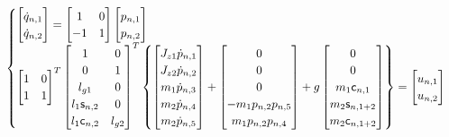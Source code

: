 \begin{itemize}
\begin{equation}
	\begin{cases}

	\begin{bmatrix}
	\dot{q}_{n,1} \\
	\dot{q}_{n,2} \\
	\end{bmatrix}
	=
	\begin{bmatrix}
	1 & 0 \\
	-1 & 1\\
	\end{bmatrix}
	\begin{bmatrix}
	p_{n,1} \\
	p_{n,2} \\
	\end{bmatrix} \\


	\begin{bmatrix}
	1 & 0 \\
	1 & 1 \\
	\end{bmatrix}^T
	\begin{bmatrix}
	 1 & 0 \\
	 0 & 1 \\
	 l_{g1} & 0 \\
	 l_1 \mathsf{s}_{n,2} & 0 \\
	 l_1 \mathsf{c}_{n,2} & l_{g2} \\
	\end{bmatrix}^T
	\begin{Bmatrix}
		\begin{bmatrix}
		J_{z1} \dot{p}_{n,1} \\
		J_{z2} \dot{p}_{n,2} \\
		m_1 \dot{p}_{n,3} \\
		m_2 \dot{p}_{n,4} \\
		m_2 \dot{p}_{n,5} \\
		\end{bmatrix}
		+
		\begin{bmatrix}
		0 \\
		0 \\
		0 \\
		- m_1 p_{n,2} p_{n,5} \\
		  m_1 p_{n,2} p_{n,4} \\
		\end{bmatrix}
		+
		g \begin{bmatrix}
		0 \\
		0 \\
		m_1 \mathsf{c}_{n,1} \\
		m_2 \mathsf{s}_{n,1+2} \\
		m_2 \mathsf{c}_{n,1+2} \\
		\end{bmatrix}
	\end{Bmatrix}
	=
	\begin{bmatrix}
	u_{n,1} \\
	u_{n,2}
	\end{bmatrix} \\


\end{cases}
\end{equation}
\end{itemize}
